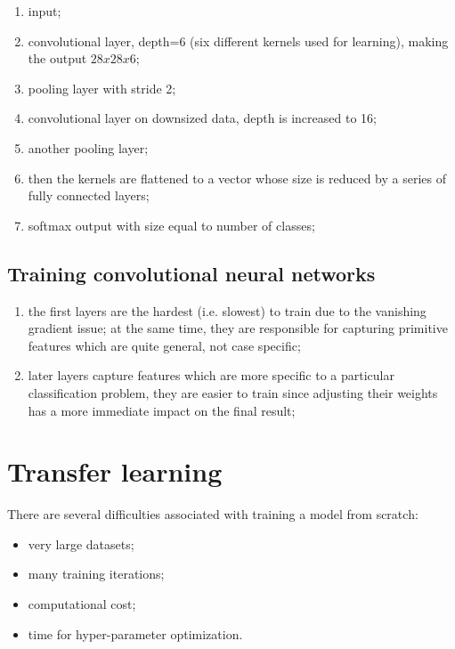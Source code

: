 \documentclass[11pt]{book}
\begin{document}
\begin{enumerate}
\item input;
\item convolutional layer, depth=6 (six different kernels used for learning), making the output $28x28x6$;
\item pooling layer with stride 2;
\item convolutional layer on downsized data, depth is increased to 16;
\item another pooling layer;
\item then the kernels are flattened to a vector whose size is reduced by a series of fully connected layers;
\item softmax output with size equal to number of classes;
\end{enumerate}

\subsection{Training convolutional neural networks}

\begin{enumerate}
\item the first layers are the hardest (i.e. slowest) to train due to the vanishing gradient issue; at the same time, they are responsible for capturing primitive features which are quite general, not case specific;

\item later layers capture features which are more specific to a particular classification problem, they are easier to train since adjusting their weights has a more immediate impact on the final result;

\end{enumerate}



\section{Transfer learning}

There are several difficulties associated with training a model from scratch:
\begin{itemize}
\item  very large datasets;
\item many training iterations;
\item computational cost;
\item time for hyper-parameter optimization.

\end{itemize}
\end{document}
